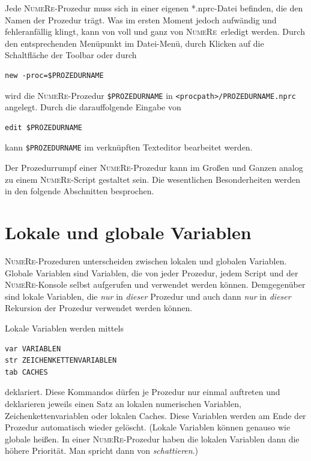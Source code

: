 \documentclass[DIV=14,headsepline,footsepline]{scrbook}
\newcommand{\NR}{\textsc{Nu\-me\-Re}}
\begin{document}
				Jede \NR-Prozedur muss sich in einer eigenen *.nprc-Datei befinden, die den Namen der Prozedur trägt. Was im ersten Moment jedoch aufwändig und fehleranfällig klingt, kann von voll und ganz von \NR\ erledigt werden. Durch den entsprechenden Menüpunkt im Datei-Menü, durch Klicken auf die Schaltfläche der Toolbar oder durch
				\begin{lstlisting}
new -proc=$PROZEDURNAME
				\end{lstlisting}
				wird die \NR-Prozedur \verb+$PROZEDURNAME+ in \verb+<procpath>/PROZEDURNAME.nprc+ angelegt. Durch die darauffolgende Eingabe von
				\begin{lstlisting}
edit $PROZEDURNAME
				\end{lstlisting}
				kann \verb+$PROZEDURNAME+ im verknüpften Texteditor bearbeitet werden.
				
				Der Prozedurrumpf einer \NR-Prozedur kann im Großen und Ganzen analog zu einem \NR-Script gestaltet sein. Die wesentlichen Besonderheiten werden in den folgende Abschnitten besprochen.
			\section{Lokale und globale Variablen}
				\NR-Prozeduren unterscheiden zwischen lokalen und globalen Variablen. Globale Variablen sind Variablen, die von jeder Prozedur, jedem Script und der \NR-Konsole selbst aufgerufen und verwendet werden können. Demgegenüber sind lokale Variablen, die \emph{nur} in \emph{dieser} Prozedur und auch dann \emph{nur} in \emph{dieser} Rekursion der Prozedur verwendet werden können.
				
				Lokale Variablen werden mittels
				\begin{lstlisting}
var VARIABLEN
str ZEICHENKETTENVARIABLEN
tab CACHES
				\end{lstlisting}
				deklariert. Diese Kommandos dürfen je Prozedur nur einmal auftreten und deklarieren jeweils einen Satz an lokalen numerischen Variablen, Zeichenkettenvariablen oder lokalen Caches. Diese Variablen werden am Ende der Prozedur automatisch wieder gelöscht. (Lokale Variablen können genauso wie globale heißen. In einer \NR-Prozedur haben die lokalen Variablen dann die höhere Priorität. Man spricht dann von \emph{schattieren}.)
\end{document}

